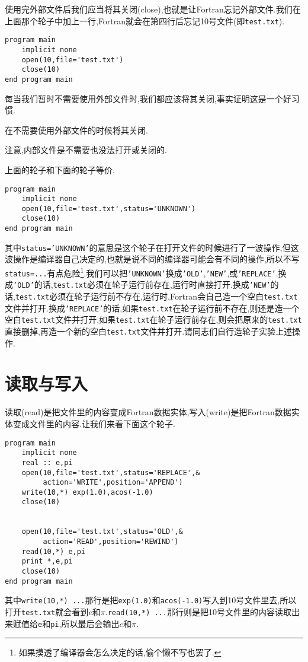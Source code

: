 使用完外部文件后我们应当将其关闭(close),也就是让Fortran忘记外部文件.我们在上面那个轮子中加上一行,Fortran就会在第四行后忘记10号文件(即\texttt{test.txt}).
\begin{lstlisting}
program main
    implicit none
    open(10,file='test.txt')
    close(10)
end program main
\end{lstlisting}

每当我们暂时不需要使用外部文件时,我们都应该将其关闭,事实证明这是一个好习惯.

\begin{convention}
    在不需要使用外部文件的时候将其关闭.
\end{convention}

注意,内部文件是不需要也没法打开或关闭的.

上面的轮子和下面的轮子等价.
\begin{lstlisting}
program main
    implicit none
    open(10,file='test.txt',status='UNKNOWN')
    close(10)
end program main
\end{lstlisting}
其中\texttt{status='UNKNOWN'}的意思是这个轮子在打开文件的时候进行了一波操作,但这波操作是编译器自己决定的,也就是说不同的编译器可能会有不同的操作,所以不写\texttt{status=...}有点危险\footnote{如果摸透了编译器会怎么决定的话,偷个懒不写也罢了.\label{no_add}}.我们可以把\texttt{'UNKNOWN'}换成\texttt{'OLD'},\texttt{'NEW'},或\texttt{'REPLACE'}.换成\texttt{'OLD'}的话,\texttt{test.txt}必须在轮子运行前存在,运行时直接打开.换成\texttt{'NEW'}的话,\texttt{test.txt}必须在轮子运行前不存在,运行时,Fortran会自己造一个空白\texttt{test.txt}文件并打开.换成\texttt{'REPLACE'}的话,如果\texttt{test.txt}在轮子运行前不存在,则还是造一个空白\texttt{test.txt}文件并打开,如果\texttt{test.txt}在轮子运行前存在,则会把原来的\texttt{test.txt}直接删掉,再造一个新的空白\texttt{test.txt}文件并打开.请同志们自行造轮子实验上述操作.

\section{读取与写入}

读取(read)是把文件里的内容变成Fortran数据实体,写入(write)是把Fortran数据实体变成文件里的内容.让我们来看下面这个轮子.
\begin{lstlisting}
program main
    implicit none
    real :: e,pi
    open(10,file='test.txt',status='REPLACE',&
         action='WRITE',position='APPEND')
    write(10,*) exp(1.0),acos(-1.0)
    close(10)


    open(10,file='test.txt',status='OLD',&
         action='READ',position='REWIND')
    read(10,*) e,pi
    print *,e,pi
    close(10)
end program main
\end{lstlisting}
其中\texttt{write(10,*) ...}那行是把\texttt{exp(1.0)}和\texttt{acos(-1.0)}写入到10号文件里去,所以打开\texttt{test.txt}就会看到$e$和$\pi$.\texttt{read(10,*) ...}那行则是把10号文件里的内容读取出来赋值给\texttt{e}和\texttt{pi},所以最后会输出$e$和$\pi$.

